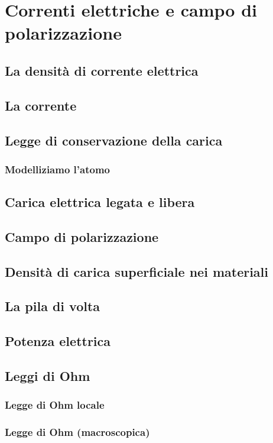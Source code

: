 \documentclass{book}
\begin{document}
\chapter{Correnti elettriche e campo di polarizzazione}
\section{La densit\`a di corrente elettrica}
\section{La corrente}
\section{Legge di conservazione della carica}
\subsection{Modelliziamo l'atomo}
\section{Carica elettrica legata e libera}
\section{Campo di polarizzazione}
\section{Densit\`a di carica superficiale nei materiali}
\section{La pila di volta}
\section{Potenza elettrica}
\section{Leggi di Ohm}
\subsection{Legge di Ohm locale}
\subsection{Legge di Ohm (macroscopica)}
\end{document}

